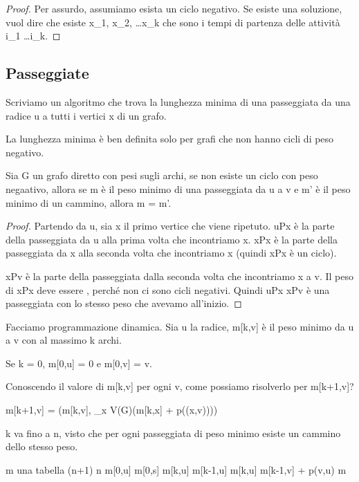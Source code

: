 \begin{proof}
Per assurdo, assumiamo esista un ciclo negativo. Se esiste una soluzione, vuol dire che esiste x_1, x_2, \ldots x_k che sono i tempi di partenza delle attivit\`a i_1 \ldots i_k.
\end{proof}

\subsection{Passeggiate}

Scriviamo un algoritmo che trova la lunghezza minima di una passeggiata da una radice u a tutti i vertici x di un grafo.

La lunghezza minima \`e ben definita solo per grafi che non hanno cicli di peso negativo.

\begin{prop}
Sia G un grafo diretto con pesi sugli archi, se non esiste un ciclo con peso negaativo, allora se m \`e il peso minimo di una passeggiata da u a v e m' \`e il peso minimo di un cammino, allora m = m'.
\end{prop}

\begin{proof}
Partendo da u, sia x il primo vertice che viene ripetuto. uPx \`e la parte della passeggiata da u alla prima volta che incontriamo x. xPx \`e la parte della passeggiata da x alla seconda volta che incontriamo x (quindi xPx \`e un ciclo).

xPv \`e la parte della passeggiata dalla seconda volta che incontriamo x a v. Il peso di xPx deve essere , perch\'e non ci sono cicli negativi. Quindi uPx \cup xPv \`e una passeggiata con lo stesso peso che avevamo all'inizio.
\end{proof}

Facciamo programmazione dinamica. Sia u la radice, m[k,v] \`e il peso minimo da u a v con al massimo k archi.

Se k = 0, m[0,u] = 0 e m[0,v] = \infty \forall v. 

Conoscendo il valore di m[k,v] per ogni v, come possiamo risolverlo per m[k+1,v]?

m[k+1,v] = \min (m[k,v], \min_{x \in V(G)}(m[k,x] + p((x,v))))

k va fino a n, visto che per ogni passeggiata di peso minimo esiste un cammino dello stesso peso.

\begin{algorithm}
\begin{algorithmic}
    \State m \gets una tabella (n+1) \times n
        \State m[0,u] \gets \infty
    \EndFor
    \State m[0,s] 
            \State m[k,u] \gets m[k-1,u]
                    \State m[k,u] \gets m[k-1,v] + p(v,u)
                \EndIf
            \EndFor
        \EndFor
    \EndFor
    \State \Return m
\EndFunction
\end{algorithmic}
\end{algorithm}

